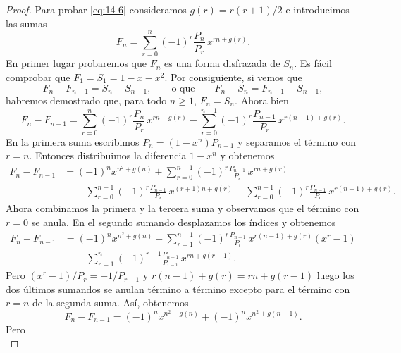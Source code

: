 \documentclass[12pt,a4paper]{book}
\begin{document}
\begin{proof}
        Para probar \eqref{eq:14-6} consideramos $g(r)=r(r+1)/2$ e introducimos las sumas
        \begin{equation*}
            F_{n}=\sum_{r=0}^{n}(-1)^{r}\frac{P_{n}}{P_{r}}\,x^{rn+g(r)}.
        \end{equation*}
        En primer lugar probaremos que $F_{n}$ es una forma disfrazada de $S_{n}$. Es fácil
        comprobar que $F_{1}=S_{1}=1-x-x^{2}$. Por consiguiente, si vemos que
        \begin{equation*}
            F_{n}-F_{n-1}=S_{n}-S_{n-1},\qquad\text{o que}\qquad F_{n}-S_{n}=F_{n-1}-S_{n-1},
        \end{equation*}
        habremos demostrado que, para todo $n\geq1$, $F_{n}=S_{n}$. Ahora bien
        \begin{equation*}
            F_{n}-F_{n-1}=\sum_{r=0}^{n}(-1)^{r}\frac{P_{n}}{P_{r}}\,x^{rn+g(r)}-\sum_{r=0}^{n-1}(-1)^{r}\frac{P_{n-1}}{P_{r}}\,x^{r(n-1)+g(r)}.
        \end{equation*}
        En la primera suma escribimos $P_{n}=(1-x^{n})P_{n-1}$ y separamos el término con $r=n$.
        Entonces distribuimos la diferencia $1-x^{n}$ y obtenemos
        \begin{align*}
            F_{n}-F_{n-1}&=(-1)^{n}x^{n^{2}+g(n)}+\sum_{r=0}^{n-1}(-1)^{r}\frac{P_{n-1}}{P_{r}}\,x^{rn+g(r)}\\
            &\quad-\sum_{r=0}^{n-1}(-1)^{r}\frac{P_{n-1}}{P_{r}}\,x^{(r+1)n+g(r)}-\sum_{r=0}^{n-1}(-1)^{r}\frac{P_{n-1}}{P_{r}}\,x^{r(n-1)+g(r)}.
        \end{align*}
        Ahora combinamos la primera y la tercera suma y observamos que el término con $r=0$ se
        anula. En el segundo sumando desplazamos los índices y obtenemos
        \begin{align*}
            F_{n}-F_{n-1}&=(-1)^{n}x^{n^{2}+g(n)}+\sum_{r=1}^{n-1}(-1)^{r}\frac{P_{n-1}}{P_{r}}\,x^{r(n-1)+g(r)}(x^{r}-1)\\
            &\quad-\sum_{r=1}^{n}(-1)^{r-1}\frac{P_{n-1}}{P_{r-1}}\,x^{rn+g(r-1)}.
        \end{align*}
        Pero $(x^{r}-1)/P_{r}=-1/P_{r-1}$ y $r(n-1)+g(r)=rn+g(r-1)$ luego los dos últimos sumandos
        se anulan término a término excepto para el término con $r=n$ de la segunda suma. Así,
        obtenemos
        \begin{equation*}
            F_{n}-F_{n-1}=(-1)^{n}x^{n^{2}+g(n)}+(-1)^{n}x^{n^{2}+g(n-1)}.
        \end{equation*}
        Pero
        \begin{equation*}

\end{equation*}
\end{proof}
\end{document}
